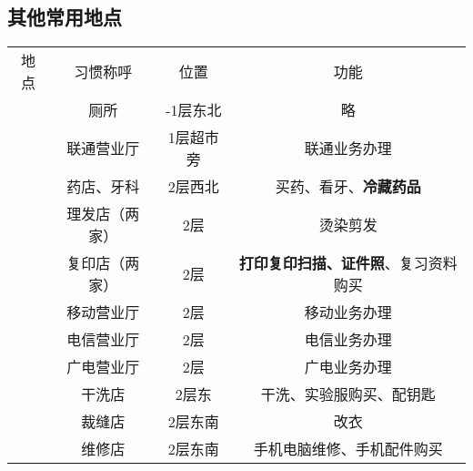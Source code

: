 \subsection[其他常用地点]{其他常用地点}
\label{common_locations}
\begin{table}[!ht]
    \vspace{-1em}
    \centering
    \begin{tabular}{|c|c|c|c|}
        \Xhline{1.2pt}
        地点                    & 习惯称呼                         & 位置     & 功能           \\
        \Xhline{1.2pt}
        \multirow{9}{*}{大服}   & 厕所                           & -1层东北  & 略            \\
        \cline{2-4}
                              & 联通营业厅                        & 1层超市旁                 %
                              & 联通业务办理                                               \\
        \cline{2-4}
                              & 药店、牙科                        & 2层西北                  %
                              & 买药、看牙、\textbf{冷藏药品}                                  \\
        \cline{2-4}
                              & 理发店（两家）                      & 2层     & 烫染剪发         \\
        \cline{2-4}
                              & 复印店（两家）                      & 2层                    %
                              & \textbf{打印复印扫描、证件照}、复习资料购买                           \\
        \cline{2-4}
                              & 移动营业厅                        & 2层     & 移动业务办理       \\
        \cline{2-4}
                              & 电信营业厅                        & 2层     & 电信业务办理       \\
        \cline{2-4}
                              & 广电营业厅                        & 2层     & 广电业务办理       \\
        \cline{2-4}
                              & 干洗店                          & 2层东    & 干洗、实验服购买、配钥匙 \\
        \cline{2-4}
                              & 裁缝店                          & 2层东南   & 改衣           \\
        \cline{2-4}
                              & 维修店                          & 2层东南                  %
                              & 手机电脑维修、手机配件购买                                        \\

\end{tabular}
\end{table}
